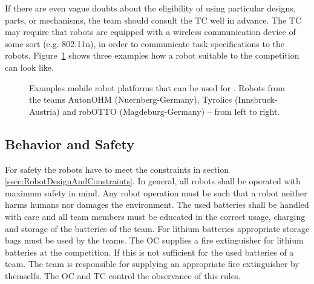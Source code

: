 If there are even vague doubts about the eligibility of using particular designs, parts, or mechanisms, the team should consult the TC well in advance.
The TC may require that robots are equipped with a wireless communication device of some sort (e.g. 802.11n), in order to communicate task specifications to the robots. Figure~\ref{fig:example_robots} shows three examples how a robot suitable to the competition can look like. 
\begin{figure} [h!]
	\begin{center}
		 \hfill
		 \hfill
		\subfloat{\missingfigure[figwidth=0.3\textwidth]{}	} 
	\end{center}
	\caption{Examples mobile robot platforms that can be used for \RCAW. Robots from the teams AutonOHM (Nuernberg-Germany), Tyrolics (Innsbruck-Austria) and robOTTO (Magdeburg-Germany) -- from left to right. }
	\label{fig:example_robots}
\end{figure}


\subsection{Behavior and Safety} \label{ssec:RobotBehaviorAndSafety}
For safety the robots have to meet the constraints in section \ref{ssec:RobotDesignAndConstraints}. In general, all robots shall be operated with maximum safety in mind. Any robot operation must be such that a robot neither harms humans nor damages the environment. 
The used batteries shall be handled with care and all team members must be educated in the correct usage, charging and storage of the batteries of the team. For lithium batteries appropriate storage bags must be used by the teams. The OC supplies a fire extinguisher for lithium batteries at the competition. If this is not sufficient for the used batteries of a team. The team is responsible for supplying an appropriate fire extinguisher by themselfs. The OC and TC control the observance of this rules.

